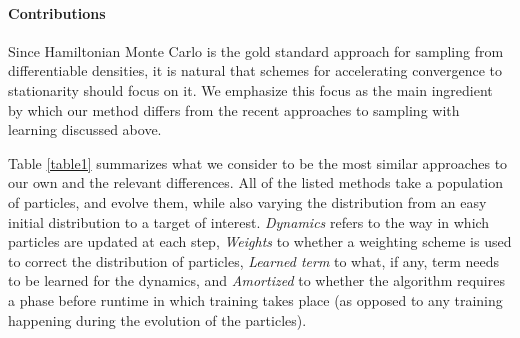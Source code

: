 \documentclass{article}
\begin{document}

\paragraph{Contributions} Since Hamiltonian Monte Carlo is the gold standard approach for sampling from differentiable densities, it is natural that schemes for accelerating convergence to stationarity should focus on it. We emphasize this focus as the main ingredient by which our method differs from the recent approaches to sampling with learning discussed above.


Table \ref{table1} summarizes what we consider to be the most similar approaches to our own and the relevant differences. All of the listed methods take a population of particles, and evolve them, while also varying the distribution from an easy initial distribution to a target of interest. \emph{Dynamics} refers to the way in which particles are updated at each step, \emph{Weights} to whether a weighting scheme is used to correct the distribution of particles, \emph{Learned term} to what, if any, term needs to be learned for the dynamics, and \emph{Amortized} to whether the algorithm requires a phase before runtime in which training takes place (as opposed to any training happening during the evolution of the particles).


\end{document}
